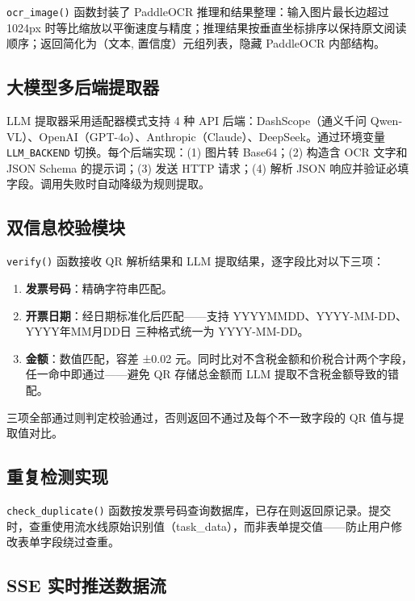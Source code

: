 \documentclass[12pt,a4paper]{ctexart}
\begin{document}
\texttt{ocr\_image()} 函数封装了 PaddleOCR 推理和结果整理：输入图片最长边超过 1024px 时等比缩放以平衡速度与精度；推理结果按垂直坐标排序以保持原文阅读顺序；返回简化为（文本, 置信度）元组列表，隐藏 PaddleOCR 内部结构。

\subsection{大模型多后端提取器}

LLM 提取器采用适配器模式支持 4 种 API 后端：DashScope（通义千问 Qwen-VL）、OpenAI（GPT-4o）、Anthropic（Claude）、DeepSeek。通过环境变量 \texttt{LLM\_BACKEND} 切换。每个后端实现：(1) 图片转 Base64；(2) 构造含 OCR 文字和 JSON Schema 的提示词；(3) 发送 HTTP 请求；(4) 解析 JSON 响应并验证必填字段。调用失败时自动降级为规则提取。

\subsection{双信息校验模块}

\texttt{verify()} 函数接收 QR 解析结果和 LLM 提取结果，逐字段比对以下三项：

\begin{enumerate}[label=(\arabic*)]
  \item \textbf{发票号码}：精确字符串匹配。
  \item \textbf{开票日期}：经日期标准化后匹配——支持 YYYYMMDD、YYYY-MM-DD、YYYY年MM月DD日 三种格式统一为 YYYY-MM-DD。
  \item \textbf{金额}：数值匹配，容差 ±0.02 元。同时比对不含税金额和价税合计两个字段，任一命中即通过——避免 QR 存储总金额而 LLM 提取不含税金额导致的错配。
\end{enumerate}

三项全部通过则判定校验通过，否则返回不通过及每个不一致字段的 QR 值与提取值对比。

\subsection{重复检测实现}

\texttt{check\_duplicate()} 函数按发票号码查询数据库，已存在则返回原记录。提交时，查重使用流水线原始识别值（task\_data），而非表单提交值——防止用户修改表单字段绕过查重。

\subsection{SSE 实时推送数据流}
\end{document}
